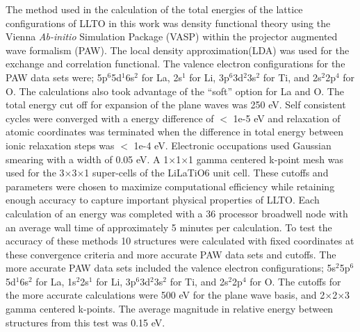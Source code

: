 \documentclass[aps,pre,reprint,superscriptaddress,showkeys]{revtex4-2}
\begin{document}
The method used in the calculation of the total energies of the lattice configurations of LLTO in this work was density functional theory using the Vienna \textit{Ab-initio} Simulation Package (VASP) \cite{Vasp1,Vasp2,Vasp3,Vasp4} within the projector augmented wave formalism (PAW)\cite{Blochl}. The local density approximation(LDA) was used for the exchange and correlation functional\cite{PBE}. The valence electron configurations for the PAW data sets were; 5p$^{6}$5d$^{1}$6s$^{2}$ for La, 2s$^{1}$ for Li, 3p$^{6}$3d$^{2}$3s$^{2}$ for Ti, and 2s$^{2}$2p$^{4}$ for O. The calculations also took advantage of the ``soft'' option for La and O.   The total energy cut off for expansion of the plane waves was 250 eV.  Self consistent cycles were converged with a energy difference of $<$ 1e-5 eV and relaxation  of atomic coordinates was terminated when the difference in total energy between ionic relaxation steps was $<$ 1e-4 eV. Electronic occupations used Gaussian smearing with a width of 0.05 eV.  A 1$\times$1$\times$1 gamma centered k-point mesh was used for the 3$\times$3$\times$1 super-cells of the LiLaTiO6 unit cell. These cutoffs and parameters were chosen to maximize computational efficiency while retaining enough accuracy to capture important physical properties of LLTO.  Each calculation of an energy was completed with a 36 processor broadwell node with an average wall time of approximately 5 minutes per calculation.  To test the accuracy of these methods 10 structures were calculated with fixed coordinates at these convergence criteria and more accurate PAW data sets and cutoffs. The more accurate PAW data sets included the valence electron configurations; 5s$^{2}$5p$^{6}$5d$^{1}$6s$^{2}$ for La, 1s$^2$2s$^{1}$ for Li, 3p$^{6}$3d$^{2}$3s$^{2}$ for Ti, and 2s$^{2}$2p$^{4}$ for O.  The cutoffs for the more accurate calculations were 500 eV for the plane wave basis, and 2$\times$2$\times$3 gamma centered k-points. The average magnitude  in relative energy between structures from this test was 0.15 eV. 
\end{document}
